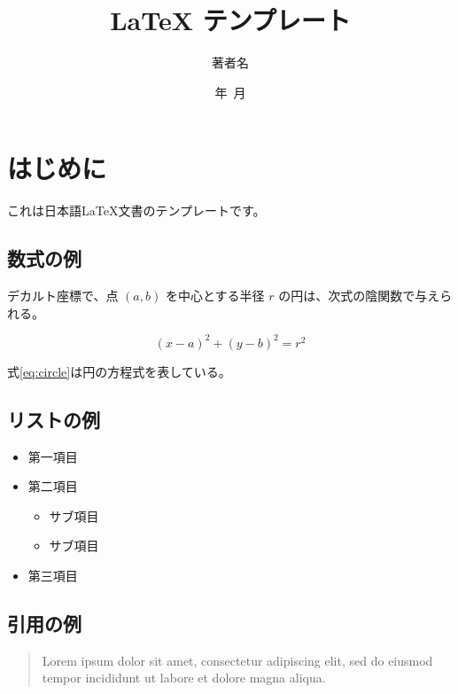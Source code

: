 \documentclass[dvipdfmx,uplatex,a4paper,10pt,oneside,onecolumn,openany]{jsbook}
\title{LaTeX テンプレート}
\author{著者名}
\date{{\the\year}年~{\the\month}月}
\begin{document}
\maketitle

\frontmatter
\setcounter{tocdepth}{2}
\tableofcontents

\mainmatter

\chapter{はじめに}

これは日本語LaTeX文書のテンプレートです。

\section{数式の例}

デカルト座標で、点 \((a, b)\) を中心とする半径 \(r\) の円は、次式の陰関数で与えられる。

\begin{equation}
(x - a)^2 + (y - b)^2 = r^2
\label{eq:circle}\end{equation}

式\ref{eq:circle}は円の方程式を表している。

\section{リストの例}

\begin{itemize}
\item 第一項目
\item 第二項目
  \begin{itemize}
  \item サブ項目
  \item サブ項目
  \end{itemize}
\item 第三項目
\end{itemize}

\section{引用の例}

\begin{quote}
Lorem ipsum dolor sit amet, consectetur adipiscing elit, sed do eiusmod tempor incididunt ut labore et dolore magna aliqua.
\end{quote}

\backmatter
\end{document}
